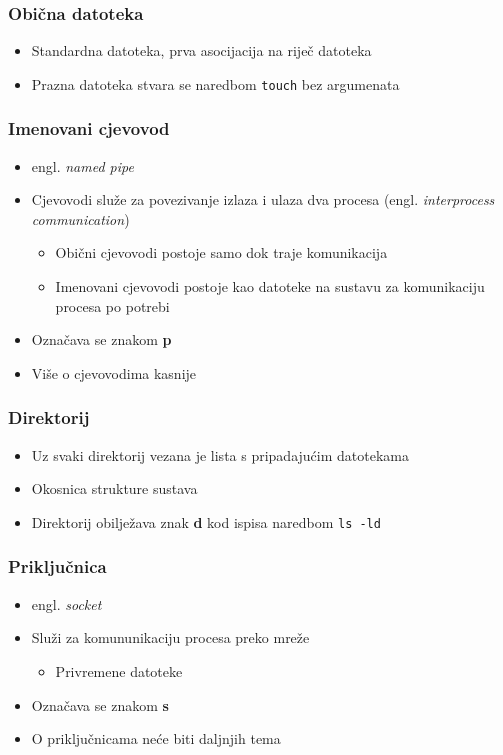 \documentclass{beamer}
\newcommand{\shell}[1]{\texttt{\small #1}}
\begin{document}
\begin{frame}[t]
\frametitle{Obična datoteka}
\begin{itemize}
  \item Standardna datoteka, prva asocijacija na riječ datoteka
  \item Prazna datoteka stvara se naredbom \shell{touch} bez argumenata
\end{itemize}
\end{frame}


\begin{frame}[t]
\frametitle{Imenovani cjevovod}
\begin{itemize}
  \item engl. \emph{named pipe}
  \item Cjevovodi služe za povezivanje izlaza i ulaza dva procesa (engl.
        \emph{interprocess communication})
  \begin{itemize}
    \item Obični cjevovodi postoje samo dok traje komunikacija
    \item Imenovani cjevovodi postoje kao datoteke na sustavu za
          komunikaciju procesa po potrebi
  \end{itemize}
  \item Označava se znakom \textbf{p}
  \item Više o cjevovodima kasnije
\end{itemize}
\end{frame}

\begin{frame}[t]
\frametitle{Direktorij}
\begin{itemize}
  \item Uz svaki direktorij vezana je lista s pripadajućim datotekama
  \item Okosnica strukture sustava
  \item Direktorij obilježava znak \textbf{d} kod ispisa naredbom
        \shell{ls -ld}
\end{itemize}
\end{frame}

\begin{frame}[t]
\frametitle{Priključnica}
\begin{itemize}
  \item engl. \emph{socket}
  \item Služi za komununikaciju procesa preko mreže
  \begin{itemize}
    \item Privremene datoteke
  \end{itemize}
  \item Označava se znakom \textbf{s}
  \item O priključnicama neće biti daljnjih tema
\end{itemize}
\end{frame}
\end{document}
